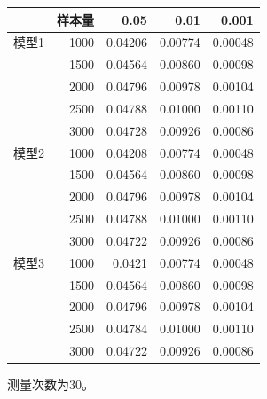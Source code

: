 \begin{table}[htbp]
\centering
{}
\label{tab:ch03-05}
\begin{tabular}{lrrrr}
\toprule
& 样本量 & 0.05 & 0.01 & 0.001\\
\midrule
模型1 & 1000 & 0.04206 & 0.00774 & 0.00048\\
 & 1500 & 0.04564 & 0.00860 & 0.00098\\
 & 2000 & 0.04796 & 0.00978 & 0.00104\\
 & 2500 & 0.04788 & 0.01000 & 0.00110\\
 & 3000 & 0.04728 & 0.00926 & 0.00086\\
\addlinespace
模型2 & 1000 & 0.04208 & 0.00774 & 0.00048\\
 & 1500 & 0.04564 & 0.00860 & 0.00098\\
 & 2000 & 0.04796 & 0.00978 & 0.00104\\
 & 2500 & 0.04788 & 0.01000 & 0.00110\\
 & 3000 & 0.04722 & 0.00926 & 0.00086\\
\addlinespace
模型3 & 1000 & 0.0421 & 0.00774 & 0.00048\\
 & 1500 & 0.04564 & 0.00860 & 0.00098\\
 & 2000 & 0.04796 & 0.00978 & 0.00104\\
 & 2500 & 0.04784 & 0.01000 & 0.00110\\
 & 3000 & 0.04722 & 0.00926 & 0.00086\\
\bottomrule
\end{tabular}
\par\smallskip
\begin{minipage}{0.78\textwidth}\footnotesize
测量次数为30。
\end{minipage}
\end{table}
